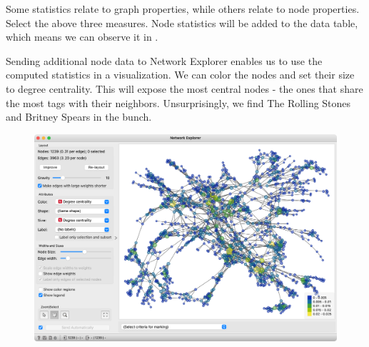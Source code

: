 Some statistics relate to graph properties, while others relate to node properties. Select the above three measures. Node statistics will be added to the data table, which means we can observe it in .

Sending additional node data to Network Explorer enables us to use the computed statistics in a visualization. We can color the nodes and set their size to degree centrality. This will expose the most central nodes - the ones that share the most tags with their neighbors. Unsurprisingly, we find The Rolling Stones and Britney Spears in the bunch.

\vspace{-0.2cm}
\begin{figure}[h]
  \centering
  \includegraphics[width=\linewidth]{network-explorer.png}%
  \caption{$\;$}
\end{figure}
\vspace{-0.3cm}

